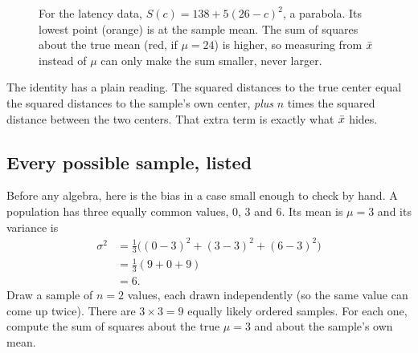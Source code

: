 \begin{figure}[H]
\centering
{}
\caption{For the latency data, $S(c)=138+5(26-c)^2$, a parabola. Its lowest point
(orange) is at the sample mean. The sum of squares about the true mean (red, if
$\mu=24$) is higher, so measuring from $\bar{x}$ instead of $\mu$ can only make the sum
smaller, never larger.}
\label{fig:center-spread-hug}
\end{figure}

The identity has a plain reading. The squared distances to the true center equal
the squared distances to the sample's own center, \emph{plus} $n$ times the squared
distance between the two centers. That extra term is exactly what $\bar{x}$ hides.

\subsection{Every possible sample, listed}

Before any algebra, here is the bias in a case small enough to check by hand. A
population has three equally common values, $0$, $3$ and $6$. Its mean is $\mu=3$
and its variance is
\begin{align*}
  \sigma^2 &= \tfrac13\big((0-3)^2 + (3-3)^2 + (6-3)^2\big) \\
           &= \tfrac13(9+0+9) \\
           &= 6 .
\end{align*}
Draw a sample of $n=2$ values, each drawn independently (so the same value can come
up twice). There are $3\times 3 = 9$ equally likely ordered samples. For each one,
compute the sum of squares about the true $\mu=3$ and about the sample's own mean.

